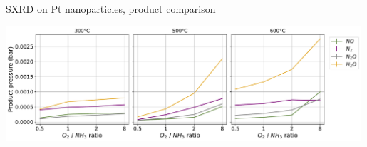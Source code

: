 \begin{frame}{SXRD on Pt nanoparticles, product comparison}

	\includegraphics[width=0.99\textwidth]{Figures/gas_analysis/SXRD/Nanoparticles/product_comparison_total_pressure.pdf}

\end{frame}